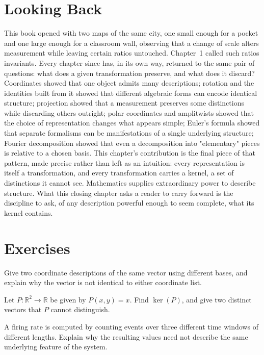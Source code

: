 \section{Looking Back}

This book opened with two maps of the same city, one small enough for a
pocket and one large enough for a classroom wall, observing that a change
of scale alters measurement while leaving certain ratios untouched.
Chapter~1 called such ratios invariants. Every chapter since has, in its
own way, returned to the same pair of questions: what does a given
transformation preserve, and what does it discard? Coordinates showed
that one object admits many descriptions; rotation and the identities
built from it showed that different algebraic forms can encode identical
structure; projection showed that a measurement preserves some
distinctions while discarding others outright; polar coordinates and
amplitwists showed that the choice of representation changes what appears
simple; Euler's formula showed that separate formalisms can be
manifestations of a single underlying structure; Fourier decomposition
showed that even a decomposition into "elementary" pieces is relative to
a chosen basis. This chapter's contribution is the final piece of that
pattern, made precise rather than left as an intuition: every
representation is itself a transformation, and every transformation
carries a kernel, a set of distinctions it cannot see. Mathematics
supplies extraordinary power to describe structure. What this closing
chapter asks a reader to carry forward is the discipline to ask, of any
description powerful enough to seem complete, what its kernel contains.

\section{Exercises}
\begin{exercise}
Give two coordinate descriptions of the same vector using different
bases, and explain why the vector is not identical to either coordinate
list.
\end{exercise}

\begin{exercise}
Let $P: \mathbb{R}^2 \to \mathbb{R}$ be given by $P(x,y) = x$. Find
$\ker(P)$, and give two distinct vectors that $P$ cannot distinguish.
\end{exercise}

\begin{exercise}
A firing rate is computed by counting events over three different time
windows of different lengths. Explain why the resulting values need not
describe the same underlying feature of the system.
\end{exercise}

